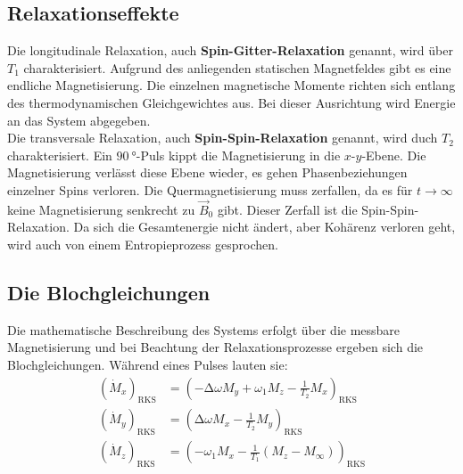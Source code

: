     \subsection{Relaxationseffekte}

        \noindent Die longitudinale Relaxation, auch \textbf{Spin-Gitter-Relaxation} genannt, wird über $T_1$ charakterisiert. Aufgrund des anliegenden statischen Magnetfeldes gibt es eine 
        endliche Magnetisierung. Die einzelnen magnetische Momente richten sich entlang des thermodynamischen Gleichgewichtes aus. Bei dieser Ausrichtung wird Energie an das System abgegeben. \\

        \noindent Die transversale Relaxation, auch \textbf{Spin-Spin-Relaxation} genannt, wird duch $T_2$ charakterisiert. Ein $\SI{90}{\degree}$-Puls kippt die Magnetisierung in die $x$-$y$-Ebene. 
        Die Magnetisierung verlässt diese Ebene wieder, es gehen Phasenbeziehungen einzelner Spins verloren. Die Quermagnetisierung muss zerfallen, da es für $t \to \infty$ 
        keine Magnetisierung senkrecht zu $\vec{B}_0$ gibt. Dieser Zerfall ist die Spin-Spin-Relaxation. Da sich die Gesamtenergie nicht ändert, aber Kohärenz verloren geht, wird auch von einem Entropieprozess 
        gesprochen. 

    \subsection{Die Blochgleichungen}

        \noindent Die mathematische Beschreibung des Systems erfolgt über die messbare Magnetisierung und bei Beachtung der Relaxationsprozesse ergeben sich die Blochgleichungen.
        Während eines Pulses lauten sie: 
        \begin{align*}
            \left(\dot{M}_x\right)_{\text{RKS}} & = \left(- \increment \omega M_y + \omega_1M_z - \frac{1}{T_2} M_x\right)_{\text{RKS}} \\
            \left(\dot{M}_y\right)_{\text{RKS}} & = \left(\increment \omega M_x - \frac{1}{T_2} M_y\right)_{\text{RKS}} \\
            \left(\dot{M}_z\right)_{\text{RKS}} & = \left( - \omega_1 M_x - \frac{1}{T_1}(M_z - M_\infty)\right)_{\text{RKS}} 
        \end{align*} 
